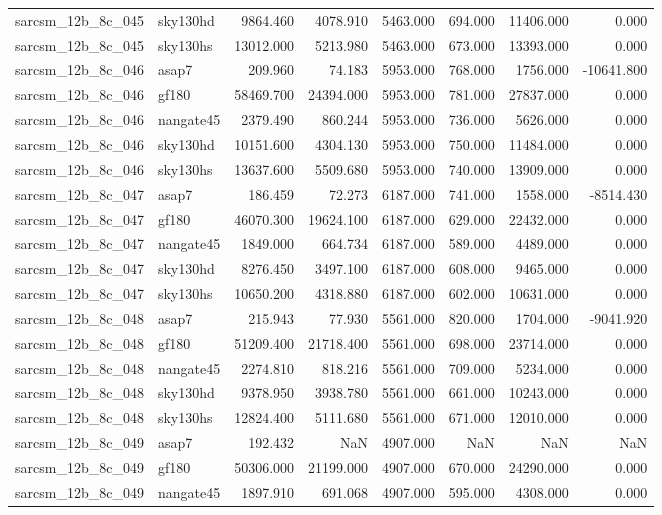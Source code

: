 \begin{tabular}{llrrrrrr}
sarcsm\_12b\_8c\_045 & sky130hd & 9864.460 & 4078.910 & 5463.000 & 694.000 & 11406.000 & 0.000 \\
sarcsm\_12b\_8c\_045 & sky130hs & 13012.000 & 5213.980 & 5463.000 & 673.000 & 13393.000 & 0.000 \\
sarcsm\_12b\_8c\_046 & asap7 & 209.960 & 74.183 & 5953.000 & 768.000 & 1756.000 & -10641.800 \\
sarcsm\_12b\_8c\_046 & gf180 & 58469.700 & 24394.000 & 5953.000 & 781.000 & 27837.000 & 0.000 \\
sarcsm\_12b\_8c\_046 & nangate45 & 2379.490 & 860.244 & 5953.000 & 736.000 & 5626.000 & 0.000 \\
sarcsm\_12b\_8c\_046 & sky130hd & 10151.600 & 4304.130 & 5953.000 & 750.000 & 11484.000 & 0.000 \\
sarcsm\_12b\_8c\_046 & sky130hs & 13637.600 & 5509.680 & 5953.000 & 740.000 & 13909.000 & 0.000 \\
sarcsm\_12b\_8c\_047 & asap7 & 186.459 & 72.273 & 6187.000 & 741.000 & 1558.000 & -8514.430 \\
sarcsm\_12b\_8c\_047 & gf180 & 46070.300 & 19624.100 & 6187.000 & 629.000 & 22432.000 & 0.000 \\
sarcsm\_12b\_8c\_047 & nangate45 & 1849.000 & 664.734 & 6187.000 & 589.000 & 4489.000 & 0.000 \\
sarcsm\_12b\_8c\_047 & sky130hd & 8276.450 & 3497.100 & 6187.000 & 608.000 & 9465.000 & 0.000 \\
sarcsm\_12b\_8c\_047 & sky130hs & 10650.200 & 4318.880 & 6187.000 & 602.000 & 10631.000 & 0.000 \\
sarcsm\_12b\_8c\_048 & asap7 & 215.943 & 77.930 & 5561.000 & 820.000 & 1704.000 & -9041.920 \\
sarcsm\_12b\_8c\_048 & gf180 & 51209.400 & 21718.400 & 5561.000 & 698.000 & 23714.000 & 0.000 \\
sarcsm\_12b\_8c\_048 & nangate45 & 2274.810 & 818.216 & 5561.000 & 709.000 & 5234.000 & 0.000 \\
sarcsm\_12b\_8c\_048 & sky130hd & 9378.950 & 3938.780 & 5561.000 & 661.000 & 10243.000 & 0.000 \\
sarcsm\_12b\_8c\_048 & sky130hs & 12824.400 & 5111.680 & 5561.000 & 671.000 & 12010.000 & 0.000 \\
sarcsm\_12b\_8c\_049 & asap7 & 192.432 & NaN & 4907.000 & NaN & NaN & NaN \\
sarcsm\_12b\_8c\_049 & gf180 & 50306.000 & 21199.000 & 4907.000 & 670.000 & 24290.000 & 0.000 \\
sarcsm\_12b\_8c\_049 & nangate45 & 1897.910 & 691.068 & 4907.000 & 595.000 & 4308.000 & 0.000 \\

\end{tabular}
